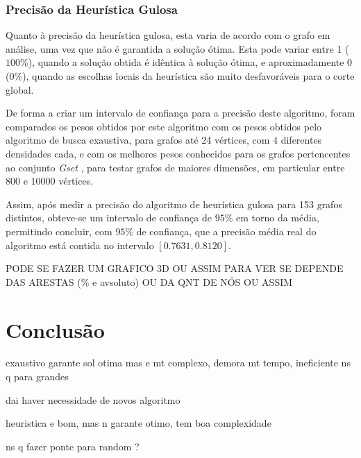 \documentclass[mirror]{revdetua}
\begin{document}
\subsubsection{Precisão da Heurística Gulosa}

Quanto à precisão da heurística gulosa, esta varia de acordo com o grafo em análise, uma vez que não é garantida a solução ótima. Esta pode variar entre 1 ($100\%$), quando a solução obtida é idêntica à solução ótima, e aproximadamente 0 ($0\%$), quando as escolhas locais da heurística são muito desfavoráveis para o corte global.

De forma a criar um intervalo de confiança para a precisão deste algoritmo, foram comparados os pesos obtidos por este algoritmo com os pesos obtidos pelo algoritmo de busca exaustiva, para grafos até 24 vértices, com 4 diferentes densidades cada, e com os melhores pesos conhecidos para os grafos pertencentes ao conjunto \textit{Gset} \cite{GS24, ME19}, para testar grafos de maiores dimensões, em particular entre $800$ e $10000$ vértices.

Assim, após medir a precisão do algoritmo de heurística gulosa para 153 grafos distintos, obteve-se um intervalo de confiança de $95\%$ em torno da média, permitindo concluir, com $95\%$ de confiança, que a precisão média real do algoritmo está contida no intervalo $[0.7631, 0.8120]$.

PODE SE FAZER UM GRAFICO 3D OU ASSIM PARA VER SE DEPENDE DAS ARESTAS (\% e avsoluto) OU DA QNT DE NÓS OU ASSIM


\section{Conclusão}

exaustivo garante sol otima mas e mt complexo, demora mt tempo, ineficiente ns q para grandes

dai haver necessidade de novos algoritmo

heuristica e bom, mas n garante otimo, tem boa complexidade

ns q fazer ponte para random ?
\end{document}
